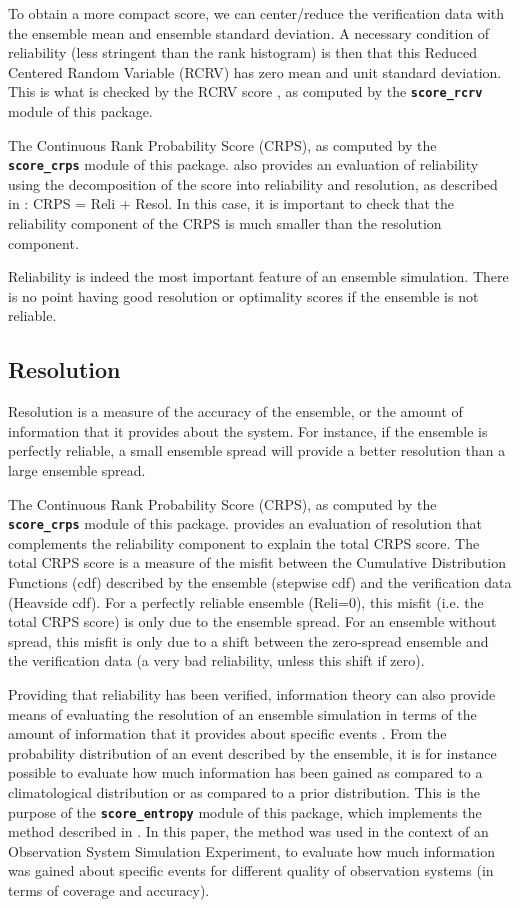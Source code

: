 \documentclass[11pt]{article}
\begin{document}
To obtain a more compact score, we can center/reduce
the verification data with the ensemble mean and ensemble standard deviation.
A necessary condition of reliability (less stringent than the rank histogram) is then that
this Reduced Centered Random Variable (RCRV) has zero mean and unit standard deviation.
This is what is checked by the RCRV score \citep{CAND07},
as computed by the {\tt\bf score\_rcrv} module of this package.

The Continuous Rank Probability Score (CRPS),
as computed by the {\tt\bf score\_crps} module of this package.
also provides an evaluation of reliability
using the decomposition of the score into reliability and resolution,
as described in \citet{HERS94}: CRPS = Reli + Resol.
In this case, it is important to check that the reliability component
of the CRPS is much smaller than the resolution component.

Reliability is indeed the most important feature of an ensemble simulation.
There is no point having good resolution or optimality scores
if the ensemble is not reliable.

\subsection{Resolution}

Resolution is a measure of the accuracy of the ensemble,
or the amount of information that it provides about the system.
For instance, if the ensemble is perfectly reliable,
a small ensemble spread will provide a better resolution
than a large ensemble spread.

The Continuous Rank Probability Score (CRPS),
as computed by the {\tt\bf score\_crps} module of this package.
provides an evaluation of resolution that complements
the reliability component to explain the total CRPS score.
The total CRPS score is a measure of the misfit between the Cumulative Distribution Functions (cdf)
described by the ensemble (stepwise cdf) and the verification data (Heavside cdf).
For a perfectly reliable ensemble (Reli=0), this misfit (i.e. the total CRPS score)
is only due to the ensemble spread.
For an ensemble without spread, this misfit is only due to a shift
between the zero-spread ensemble and the verification data
(a very bad reliability, unless this shift if zero).

Providing that reliability has been verified,
information theory can also provide means of evaluating
the resolution of an ensemble simulation
in terms of the amount of information that it provides about specific events \citep{ROUL02}.
From the probability distribution of an event described by the ensemble,
it is for instance possible to evaluate how much information
has been gained as compared to a climatological distribution
or as compared to a prior distribution.
This is the purpose of the  {\tt\bf score\_entropy} module of this package,
which implements the method described in \citep{GERM19}.
In this paper, the method was used in the context
of an Observation System Simulation Experiment,
to evaluate how much information was gained about specific events
for different quality of observation systems
(in terms of coverage and accuracy).
\end{document}

